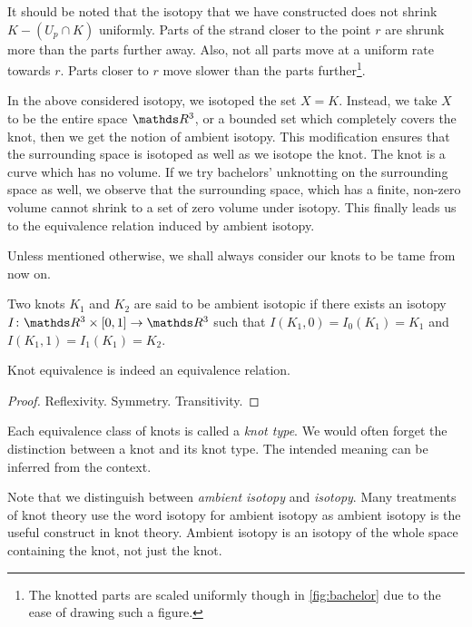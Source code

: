 \begin{remark}
    It should be noted that the isotopy that we have constructed does not shrink \(K - (U_p \cap K)\) uniformly. Parts of the strand closer to the point \(r\) are shrunk more than the parts further away. Also, not all parts move at a uniform rate towards \(r\). Parts closer to \(r\) move slower than the parts further\footnote{The knotted parts are scaled uniformly though in \cref{fig:bachelor} due to the ease of drawing such a figure.}.
\end{remark}


In the above considered isotopy, we isotoped the set \(X = K\). Instead, we take \(X\) to be the entire space \(\rthree\), or a bounded set which completely covers the knot, then we get the notion of ambient isotopy. This modification ensures that the surrounding space is isotoped as well as we isotope the knot. The knot is a curve which has no volume. If we try bachelors' unknotting on the surrounding space as well, we observe that the surrounding space, which has a finite, non-zero volume cannot shrink to a set of zero volume under isotopy. This finally leads us to the equivalence relation induced by ambient isotopy.

\begin{remark}
    Unless mentioned otherwise, we shall always consider our knots to be tame from now on.
\end{remark}


\begin{defn}
    Two knots \(K_1\) and \(K_2\) are said to be ambient isotopic if there exists an isotopy \(I \colon \rthree \times [0,1] \rightarrow \rthree\) such that \(I(K_1,0) = I_0(K_1) = K_1\) and \(I(K_1,1) = I_1(K_1) = K_2\).
\end{defn}
\begin{prop}
    Knot equivalence is indeed an equivalence relation.
\end{prop}
\begin{proof}
    Reflexivity.
    Symmetry.
    Transitivity.
\end{proof}

\begin{remark}
    Each equivalence class of knots is called a \textit{knot type}. We would often forget the distinction between a knot and its knot type. The intended meaning can be inferred from the context.
\end{remark}

\begin{remark}
    Note that we distinguish between \textit{ambient isotopy} and \textit{isotopy}. Many treatments of knot theory use the word isotopy for ambient isotopy as ambient isotopy is the useful construct in knot theory. Ambient isotopy is an isotopy of the whole space containing the knot, not just the knot.
\end{remark}

